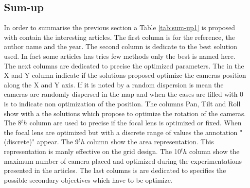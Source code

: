 %	
	
	
	 \subsection{Sum-up} 
	 In order to summarise the previous section a Table \ref{tab:sum-up1} is proposed with contain the interesting articles. The first column is for the reference, the author name and the year. The second column is dedicate to  the best solution used. In fact some articles has tries few methods only the best is named here. The next columns are dedicated to precise the  optimized parameters. The  in the X and Y column indicate  if the solutions proposed optimize the cameras position along the X and  Y axis. If  it is noted by a random dispersion is mean the cameras are randomly dispersed in the map and when the cases are filled with 0 is to indicate non optimization of the position.
	 The columns Pan, Tilt and Roll show with a  the solutions which propose to optimize the rotation of the cameras. The 8$^th$ column are used to precise if the focal lens is optimized or fixed.  When the focal lens are optimized but with a discrete  range of values the annotation "(discrete)" appear. The 9$^th$ column show the area representation. This representation is manly effective on the grid design. The 10$^th$ column show the maximum number of camera placed  and optimized during the experimentations presented in the articles. The last columns  is are dedicated to specifies  the possible secondary objectives which have to be optimize.
